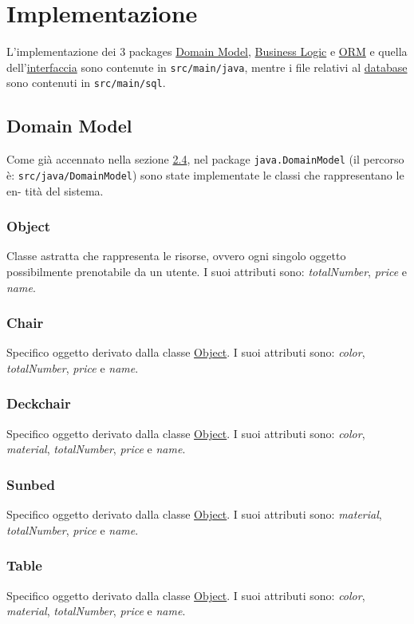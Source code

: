\documentclass{article}
\begin{document}
\section{Implementazione}\label{sec:implementazione}
L'implementazione dei 3 packages \hyperref[subsec:domainmodel]{Domain Model}, \hyperref[subsec:BusinessLogic]{Business Logic} e
\hyperref[subsec:ORM]{ORM} e quella dell'\hyperref[subsec:interfaccia-cli]{interfaccia} sono contenute in \texttt{src/main/java},
mentre i file relativi al \hyperref[subsec:Database]{database} sono contenuti in \texttt{src/main/sql}.
\subsection{Domain Model}\label{subsec:domainmodel}
Come già accennato nella sezione \hyperref[subsec:class-diagram]{2.4}, nel package \texttt{java.DomainModel} (il percorso è:
\texttt{src/java/DomainModel}) sono state implementate le classi che rappresentano le en-
tità del sistema.
\subsubsection{Object}\label{subsubsec:object}
Classe astratta che rappresenta le risorse, ovvero ogni singolo oggetto possibilmente prenotabile da un utente. I suoi attributi sono: \textit{totalNumber}, \textit{price} e \textit{name}.
\subsubsection{Chair}\label{subsubsec:chair}
Specifico oggetto derivato dalla classe \hyperref[subsubsec:object]{Object}. I suoi attributi sono: \textit{color},  \textit{totalNumber}, \textit{price} e \textit{name}.
\subsubsection{Deckchair}\label{subsubsec:deckchair}
Specifico oggetto derivato dalla classe \hyperref[subsubsec:object]{Object}. I suoi attributi sono: \textit{color}, \textit{material},  \textit{totalNumber}, \textit{price} e \textit{name}.
\subsubsection{Sunbed}\label{subsubsec:sunbed}
Specifico oggetto derivato dalla classe \hyperref[subsubsec:object]{Object}. I suoi attributi sono: \textit{material},  \textit{totalNumber}, \textit{price} e \textit{name}.
\subsubsection{Table}\label{subsubsec:table}
Specifico oggetto derivato dalla classe \hyperref[subsubsec:object]{Object}. I suoi attributi sono: \textit{color}, \textit{material},  \textit{totalNumber}, \textit{price} e \textit{name}.
\end{document}
